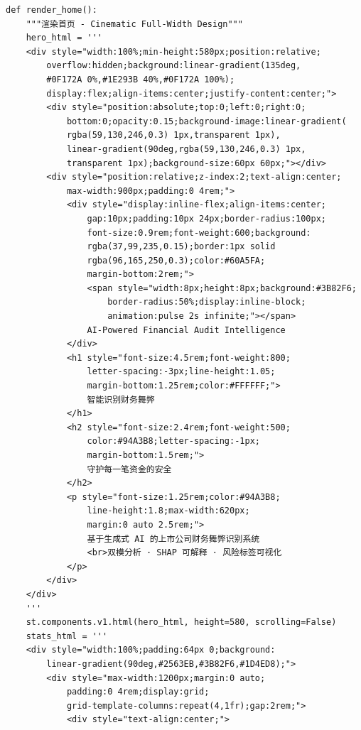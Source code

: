 \documentclass[a4paper,10pt]{article}
\begin{document}
\begin{lstlisting}
def render_home():
    """渲染首页 - Cinematic Full-Width Design"""
    hero_html = '''
    <div style="width:100%;min-height:580px;position:relative;
        overflow:hidden;background:linear-gradient(135deg,
        #0F172A 0%,#1E293B 40%,#0F172A 100%);
        display:flex;align-items:center;justify-content:center;">
        <div style="position:absolute;top:0;left:0;right:0;
            bottom:0;opacity:0.15;background-image:linear-gradient(
            rgba(59,130,246,0.3) 1px,transparent 1px),
            linear-gradient(90deg,rgba(59,130,246,0.3) 1px,
            transparent 1px);background-size:60px 60px;"></div>
        <div style="position:relative;z-index:2;text-align:center;
            max-width:900px;padding:0 4rem;">
            <div style="display:inline-flex;align-items:center;
                gap:10px;padding:10px 24px;border-radius:100px;
                font-size:0.9rem;font-weight:600;background:
                rgba(37,99,235,0.15);border:1px solid
                rgba(96,165,250,0.3);color:#60A5FA;
                margin-bottom:2rem;">
                <span style="width:8px;height:8px;background:#3B82F6;
                    border-radius:50%;display:inline-block;
                    animation:pulse 2s infinite;"></span>
                AI-Powered Financial Audit Intelligence
            </div>
            <h1 style="font-size:4.5rem;font-weight:800;
                letter-spacing:-3px;line-height:1.05;
                margin-bottom:1.25rem;color:#FFFFFF;">
                智能识别财务舞弊
            </h1>
            <h2 style="font-size:2.4rem;font-weight:500;
                color:#94A3B8;letter-spacing:-1px;
                margin-bottom:1.5rem;">
                守护每一笔资金的安全
            </h2>
            <p style="font-size:1.25rem;color:#94A3B8;
                line-height:1.8;max-width:620px;
                margin:0 auto 2.5rem;">
                基于生成式 AI 的上市公司财务舞弊识别系统
                <br>双模分析 · SHAP 可解释 · 风险标签可视化
            </p>
        </div>
    </div>
    '''
    st.components.v1.html(hero_html, height=580, scrolling=False)
    stats_html = '''
    <div style="width:100%;padding:64px 0;background:
        linear-gradient(90deg,#2563EB,#3B82F6,#1D4ED8);">
        <div style="max-width:1200px;margin:0 auto;
            padding:0 4rem;display:grid;
            grid-template-columns:repeat(4,1fr);gap:2rem;">
            <div style="text-align:center;">

\end{lstlisting}
\end{document}
